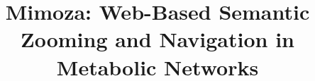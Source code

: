 \documentclass{bmcart}
\begin{document}
\begin{frontmatter}

\begin{fmbox}


\title{Mimoza: Web-Based Semantic Zooming and Navigation in Metabolic Networks}


\author[
   addressref={aff1},                   %
   corref={aff1},                       %
   email={anna.zhukova@inria.fr}   %
]{ }
\author[
   addressref={aff1},
   email={david.sherman@inria.fr}
]{ }


\address[id=aff1]{%
  , %
  ,                     %
  ,                              %
}


\end{fmbox}
\end{frontmatter}
\end{document}
